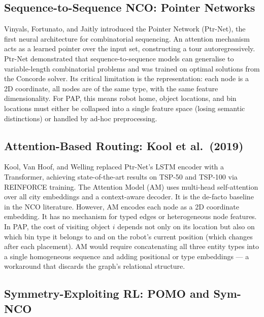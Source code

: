 \documentclass[conference]{IEEEtran}
\begin{document}
\subsection{Sequence-to-Sequence NCO: Pointer Networks}

Vinyals, Fortunato, and Jaitly \cite{vinyals2015pointer} introduced the Pointer Network (Ptr-Net), the first neural architecture for combinatorial sequencing. An attention mechanism acts as a learned pointer over the input set, constructing a tour autoregressively. Ptr-Net demonstrated that sequence-to-sequence models can generalise to variable-length combinatorial problems and was trained on optimal solutions from the Concorde solver. Its critical limitation is the representation: each node is a 2D coordinate, all nodes are of the same type, with the same feature dimensionality. For PAP, this means robot home, object locations, and bin locations must either be collapsed into a single feature space (losing semantic distinctions) or handled by ad-hoc preprocessing.

\subsection{Attention-Based Routing: Kool et al.\ (2019)}

Kool, Van Hoof, and Welling \cite{kool2019attention} replaced Ptr-Net's LSTM encoder with a Transformer, achieving state-of-the-art results on TSP-50 and TSP-100 via REINFORCE training. The Attention Model (AM) uses multi-head self-attention over all city embeddings and a context-aware decoder. It is the de-facto baseline in the NCO literature. However, AM encodes each node as a 2D coordinate embedding. It has no mechanism for typed edges or heterogeneous node features. In PAP, the cost of visiting object $i$ depends not only on its location but also on which bin type it belongs to and on the robot's current position (which changes after each placement). AM would require concatenating all three entity types into a single homogeneous sequence and adding positional or type embeddings --- a workaround that discards the graph's relational structure.

\subsection{Symmetry-Exploiting RL: POMO and Sym-NCO}
\end{document}
